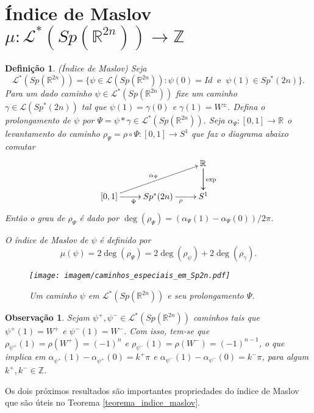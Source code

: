 \documentclass[12pt]{book}
\newtheorem{definicao}[teorema]{Definição}
\newtheorem{observacao}[teorema]{Observação}
\newcommand{\caminhosespeciais}[1]{\mathcal{L}^{*}(#1)}
\newcommand{\caminhos}{\mathcal{L}}
\newcommand{\circulo}{S^{1}}
\newcommand{\dominioMaslov}{\caminhos^{*}(\gruposimpletico{\real{2n}})}
\newcommand{\gruposimpletico}[1]{Sp(#1)}
\newcommand{\gruposimpleticonaodegenerado}[1]{Sp^{#1}(2n)}
\newcommand{\inteiros}{\mathbb{Z}}
\newcommand{\intervalo}{[0,1]}
\newcommand{\real}[1]{\mathbb{R}^{#1}}
\newcommand{\reta}{\real{}}
\begin{document}
	
	\section{Índice de Maslov $\mu : \dominioMaslov \to \inteiros$}\label{secao_indice_maslov}
	
	\begin{definicao}
		(Índice de Maslov) 
		Seja 
		$$
		\dominioMaslov=\{ \psi \in \caminhos(\gruposimpletico{\real{2n}}): \psi(0)=Id \;\; \text{e}\;\; \psi(1)\in \gruposimpleticonaodegenerado{*}\}.
		$$
		Para um dado caminho $\psi \in \dominioMaslov$ fixe um caminho $\gamma \in \caminhos(\gruposimpleticonaodegenerado{*})$ tal que $\psi(1)=\gamma(0)$ e $\gamma(1)=W^{\pm}$. Defina o prolongamento de $\psi$ por $\Psi = \psi*\gamma \in   \dominioMaslov$. Seja $\alpha_{\Psi}: \intervalo \to \reta$ o levantamento do caminho $\rho_{\Psi} = \rho \circ \Psi:\intervalo\to \circulo$ que faz o diagrama abaixo comutar
		$$
		\xymatrix{
			& & \real{}\ar[d]\ar[d]^{\text{exp}}
			\\
			[0,1 ]\ar[urr]^{\alpha_{\Psi}} \ar[r]_{\Psi} & \gruposimpleticonaodegenerado{*} \ar[r]_{\rho} & S^{1}
		}
		$$	
		Então o grau de $\rho_{\Psi}$ é dado por $\deg(\rho_{\Psi}) = (\alpha_{\Psi}(1)-\alpha_{\Psi}(0))/2\pi$. 
		
		O índice de Maslov de $\psi$ é definido por
		$$
		\mu(\psi)= 2\deg(\rho_{\Psi}) = 2\deg(\rho_{\psi}) + 2\deg(\rho_{\gamma}).
		$$
		\begin{figure}[!h]
			\centering
			\texttt{[image: imagem/caminhos\_especiais\_em\_Sp2n.pdf]}
			\caption{Um caminho $\psi$ em $\caminhosespeciais{\gruposimpletico{\real{2n}}}$ e seu prolongamento $\Psi$.}
		\end{figure}
	\end{definicao}
	
	\begin{observacao}
		Sejam $\psi^{+}, \psi^{-} \in  \caminhosespeciais{\gruposimpletico{\real{2n}}}$ caminhos tais que $\psi^{+}(1)=W^{+}$ e $\psi^{-}(1)=W^{-}$. Com isso, tem-se que $\rho_{\psi^{+}}(1) =\rho(W^{+}) = (-1)^{n}$ e $\rho_{\psi^{-}}(1) =\rho(W^{-}) = (-1)^{n-1}$, o que implica em $\alpha_{\psi^{+}}(1)-\alpha_{\psi^{+}}(0) = k^{+}\pi$ e $\alpha_{\psi^{-}}(1)-\alpha_{\psi^{-}}(0) = k^{-}\pi$, para algum $k^{+}, k^{-}\in \inteiros$.
	\end{observacao}
	
	Os dois próximos resultados são importantes propriedades do índice de Maslov que são úteis no Teorema \ref{teorema_indice_maslov}.
\end{document}

